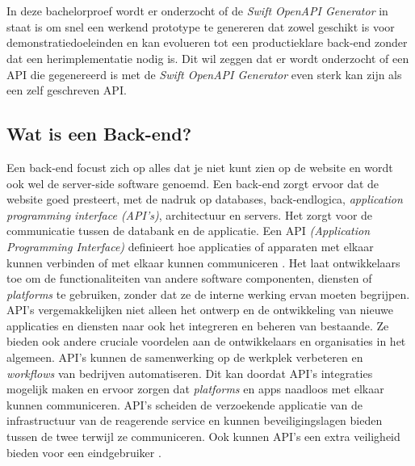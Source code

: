 \chapter{}%
\label{ch:stand-van-zaken}



In deze bachelorproef wordt er onderzocht of de \textit{Swift OpenAPI Generator} in staat is om snel een werkend prototype te genereren dat zowel geschikt is voor demonstratiedoeleinden en kan evolueren tot een productieklare back-end zonder dat een herimplementatie nodig is. Dit wil zeggen dat er wordt onderzocht of een API die gegenereerd is met de \textit{Swift OpenAPI Generator} even sterk kan zijn als een zelf geschreven API.

\section{Wat is een Back-end?}

Een back-end focust zich op alles dat je niet kunt zien op de website en wordt ook wel de server-side software genoemd. Een back-end zorgt ervoor dat de website goed presteert, met de nadruk op databases, back-endlogica, \textit{application programming interface (API's)}, architectuur en servers. Het zorgt voor de communicatie tussen de databank en de applicatie. 
Een API \textit{(Application Programming Interface)} definieert hoe applicaties of apparaten met elkaar kunnen verbinden of met elkaar kunnen communiceren \autocite{IBM}. Het laat ontwikkelaars toe om de functionaliteiten van andere software componenten, diensten of \textit{platforms} te gebruiken, zonder dat ze de interne werking ervan moeten begrijpen. \\
 
API’s vergemakkelijken niet alleen het ontwerp en de ontwikkeling van nieuwe applicaties en diensten naar ook het integreren en beheren van bestaande. Ze bieden ook andere cruciale voordelen aan de ontwikkelaars en organisaties in het algemeen. API’s kunnen de samenwerking op de werkplek verbeteren en \textit{workflows} van bedrijven automatiseren. Dit kan doordat API’s integraties mogelijk maken en ervoor zorgen dat \textit{platforms} en apps naadloos met elkaar kunnen communiceren. API’s scheiden de verzoekende applicatie van de infrastructuur van de reagerende service en kunnen beveiligingslagen bieden tussen de twee terwijl ze communiceren. Ook kunnen API’s een extra veiligheid bieden voor een eindgebruiker \autocite{IBMa}.  \\

